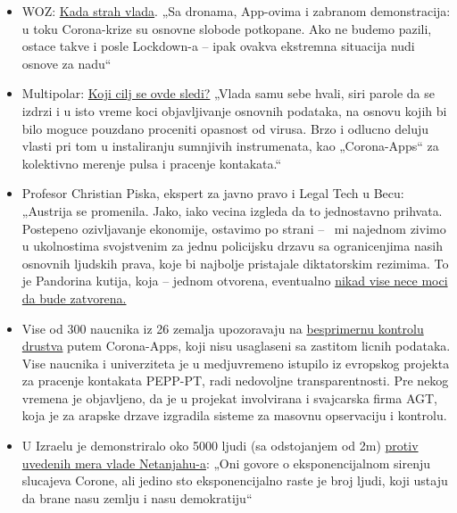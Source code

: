 \begin{itemize}
\tightlist
\item
  WOZ:
  \href{https://www.woz.ch/2016/grundrechte/wenn-die-angst-regiert}{Kada
  strah vlada}. „Sa dronama, App-ovima i zabranom demonstracija: u toku
  Corona-krize su osnovne slobode potkopane. Ako ne budemo pazili,
  ostace takve i posle Lockdown-a -- ipak ovakva ekstremna situacija
  nudi osnove za nadu``
\item
  Multipolar:
  \href{https://multipolar-magazin.de/artikel/die-massnahmen-wirken}{Koji
  cilj se ovde sledi?} „Vlada samu sebe hvali, siri parole da se izdrzi
  i u isto vreme koci objavljivanje osnovnih podataka, na osnovu kojih
  bi bilo moguce pouzdano proceniti opasnost od virusa. Brzo i odlucno
  deluju vlasti pri tom u instaliranju sumnjivih instrumenata, kao
  „Corona-Apps`` za kolektivno merenje pulsa i pracenje kontakata.``
\item
  Profesor Christian Piska, ekspert za javno pravo i Legal Tech u Becu:
  „Austrija se promenila. Jako, iako vecina izgleda da to jednostavno
  prihvata. Postepeno ozivljavanje ekonomije, ostavimo po strani -- ~mi
  najednom zivimo u ukolnostima svojstvenim za jednu policijsku drzavu
  sa ogranicenjima nasih osnovnih ljudskih prava, koje bi najbolje
  pristajale diktatorskim rezimima. To je Pandorina kutija, koja --
  jednom otvorena, eventualno
  \href{https://kurier.at/meinung/das-juristische-totschlagargument-vom-menschenleben/400814570}{nikad
  vise nece moci da bude zatvorena.}
\item
  Vise od 300 naucnika iz 26 zemalja upozoravaju na
  \href{https://www.golem.de/news/corona-app-300-wissenschaftler-warnen-vor-zentraler-datenspeicherung-2004-147973.html}{besprimernu
  kontrolu drustva} putem Corona-Apps, koji nisu usaglaseni sa zastitom
  licnih podataka. Vise naucnika i univerziteta je u medjuvremeno
  istupilo iz evropskog projekta za pracenje kontakata PEPP-PT, radi
  nedovoljne transparentnosti. Pre nekog vremena je objavljeno, da je u
  projekat involvirana i svajcarska firma AGT, koja je za arapske drzave
  izgradila sisteme za masovnu opservaciju i kontrolu.
\item
  U Izraelu je demonstriralo oko 5000 ljudi (sa odstojanjem od 2m)
  \href{https://edition.cnn.com/2020/04/20/middleeast/israel-protest-social-distancing-intl/index.html}{protiv
  uvedenih mera vlade Netanjahu-a}: „Oni govore o eksponencijalnom
  sirenju slucajeva Corone, ali jedino sto eksponencijalno raste je broj
  ljudi, koji ustaju da brane nasu zemlju i nasu demokratiju``

\end{itemize}
